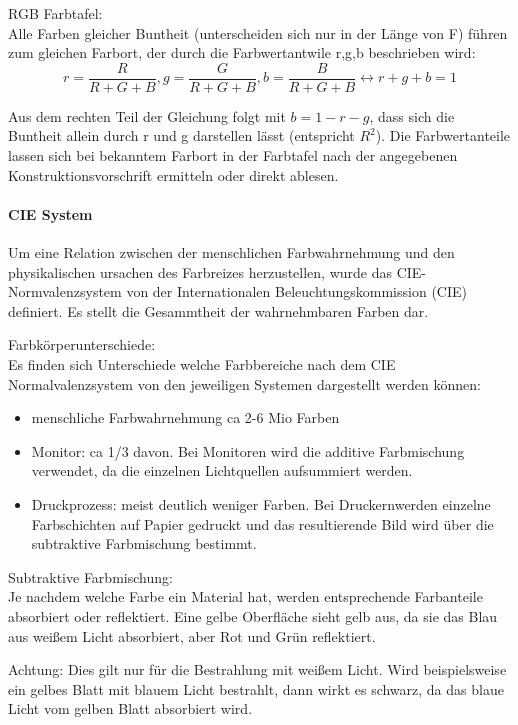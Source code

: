 \documentclass[10pt,landscape]{article}
\begin{document}
\begin{multicols}{3}
  RGB Farbtafel:\\
  Alle Farben gleicher Buntheit (unterscheiden sich nur in der Länge von F) führen zum gleichen Farbort, der durch die Farbwertantwile r,g,b beschrieben wird:
  $$r=\frac{R}{R+G+B}, g=\frac{G}{R+G+B}, b=\frac{B}{R+G+B} \leftrightarrow r+g+b=1$$
  
  Aus dem rechten Teil der Gleichung folgt mit $b=1-r-g$, dass sich die Buntheit allein durch r und g darstellen lässt (entspricht $R^2$).
  Die Farbwertanteile lassen sich bei bekanntem Farbort in der Farbtafel nach der angegebenen Konstruktionsvorschrift ermitteln oder direkt ablesen.
  
  
  \paragraph{CIE System}
  Um eine Relation zwischen der menschlichen Farbwahrnehmung und den physikalischen ursachen des Farbreizes herzustellen, wurde das CIE-Normvalenzsystem von der Internationalen Beleuchtungskommission (CIE) definiert. Es stellt die Gesammtheit der wahrnehmbaren Farben dar.
  
  Farbkörperunterschiede:\\
  Es finden sich Unterschiede welche Farbbereiche nach dem CIE Normalvalenzsystem von den jeweiligen Systemen dargestellt werden können:
  \begin{itemize}
    \item menschliche Farbwahrnehmung ca 2-6 Mio Farben
    \item Monitor: ca 1/3 davon. Bei Monitoren wird die additive Farbmischung verwendet, da die einzelnen Lichtquellen aufsummiert werden.
    \item Druckprozess: meist deutlich weniger Farben. Bei Druckernwerden einzelne Farbschichten auf Papier gedruckt und das resultierende Bild wird über die subtraktive Farbmischung bestimmt.
  \end{itemize}
  
  Subtraktive Farbmischung:\\
  Je nachdem welche Farbe ein Material hat, werden entsprechende Farbanteile absorbiert oder reflektiert. Eine gelbe Oberfläche sieht gelb aus, da sie das Blau aus weißem Licht absorbiert, aber Rot und Grün reflektiert.
  
  Achtung: Dies gilt nur für die Bestrahlung mit weißem Licht. Wird beispielsweise ein gelbes Blatt mit blauem Licht bestrahlt, dann wirkt es schwarz, da das blaue Licht vom gelben Blatt absorbiert wird.
  

\end{multicols}
\end{document}
